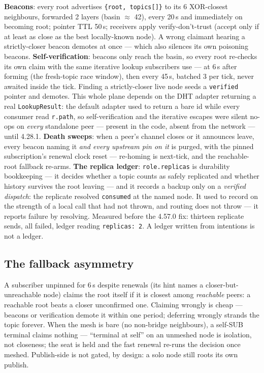 \documentclass[nobib]{tufte-handout}
\begin{document}
\textbf{Beacons}: every root advertises \texttt{\{root, topics[]\}} to
its 6 XOR-closest neighbours, forwarded 2 layers (basin $\approx$ 42),
every 20\,s and immediately on becoming root; pointer TTL 50\,s;
receivers apply verify-don't-trust (accept only if at least as close as
the best locally-known node). A wrong claimant hearing a strictly-closer
beacon demotes at once --- which also silences its own poisoning
beacons. \textbf{Self-verification}: beacons only reach the basin, so
every root re-checks its own claim with the same iterative lookup
subscribers use --- at 6\,s after forming (the fresh-topic race window),
then every 45\,s, batched 3 per tick, never awaited inside the tick.
Finding a strictly-closer live node seeds a \texttt{verified} pointer
and demotes. This whole plane depends on the DHT adapter returning a
real \texttt{LookupResult}: the default adapter used to return a bare
id while every consumer read \texttt{r.path}, so self-verification and
the iterative escapes were silent no-ops on \emph{every} standalone
peer --- present in the code, absent from the network --- until 4.28.1. \textbf{Death sweeps}: when a peer's channel closes or it
announces leave, every beacon naming it \emph{and every upstream pin on
it} is purged, with the pinned subscription's renewal clock reset ---
re-homing is next-tick, and the reachable-root fallback re-arms.
\textbf{The replica ledger}: \texttt{role.replicas} is durability
bookkeeping --- it decides whether a topic counts as safely replicated
and whether history survives the root leaving --- and it records a
backup only on a \emph{verified dispatch}: the replicate resolved
\texttt{consumed} at the named node. It used to record on the strength
of a local call that had not thrown, and routing does not throw --- it
reports failure by resolving. Measured before the 4.57.0 fix: thirteen
replicate sends, all failed, ledger reading \texttt{replicas:\,2}. A
ledger written from intentions is not a ledger.

\subsection{The fallback asymmetry}

A subscriber unpinned for 6\,s despite renewals (its hint names a
closer-but-unreachable node) claims the root itself if it is closest
among \emph{reachable} peers: a reachable root beats a closer
unconfirmed one. Claiming wrongly is cheap --- beacons or verification
demote it within one period; deferring wrongly strands the topic
forever. When the mesh is bare (no non-bridge neighbours), a self-SUB
terminal claims nothing --- ``terminal at self'' on an unmeshed node is
isolation, not closeness; the seat is held and the fast renewal re-runs
the decision once meshed. Publish-side is not gated, by design: a solo
node still roots its own publish.
\end{document}
